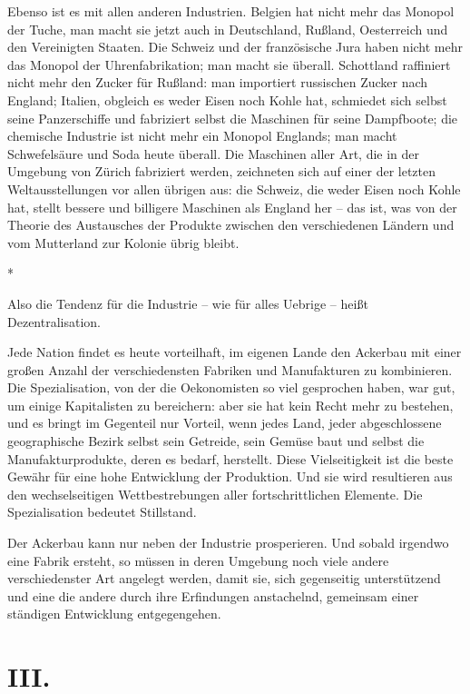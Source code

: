 \documentclass{scrbook}
\begin{document}
Ebenso ist es mit allen anderen Industrien. Belgien hat nicht mehr das Monopol der Tuche, man macht sie jetzt auch in Deutschland, Rußland, Oesterreich und den Vereinigten Staaten. Die Schweiz und der französische Jura haben nicht mehr das Monopol der Uhrenfabrikation; man macht sie überall. Schottland raffiniert nicht mehr den Zucker für Rußland: man importiert russischen Zucker nach England; Italien, obgleich es weder Eisen noch Kohle hat, schmiedet sich selbst seine Panzerschiffe und fabriziert selbst die Maschinen für seine Dampfboote; die chemische Industrie ist nicht mehr ein Monopol Englands; man macht Schwefelsäure und Soda heute überall. Die Maschinen aller Art, die in der Umgebung von Zürich fabriziert werden, zeichneten sich auf einer der letzten Weltausstellungen vor allen übrigen aus: die Schweiz, die weder Eisen noch Kohle hat, stellt bessere und billigere Maschinen als England her – das ist, was von der Theorie des Austausches der Produkte zwischen den verschiedenen Ländern und vom Mutterland zur Kolonie übrig bleibt.

\begin{center}*\end{center}

Also die Tendenz für die Industrie – wie für alles Uebrige – heißt Dezentralisation.

Jede Nation findet es heute vorteilhaft, im eigenen Lande den Ackerbau mit einer großen Anzahl der verschiedensten Fabriken und Manufakturen zu kombinieren. Die Spezialisation, von der die Oekonomisten so viel gesprochen haben, war gut, um einige Kapitalisten zu bereichern: aber sie hat kein Recht mehr zu bestehen, und es bringt im Gegenteil nur Vorteil, wenn jedes Land, jeder abgeschlossene geographische Bezirk selbst sein Getreide, sein Gemüse baut und selbst die Manufakturprodukte, deren es bedarf, herstellt. Diese Vielseitigkeit ist die beste Gewähr für eine hohe Entwicklung der Produktion. Und sie wird resultieren aus den wechselseitigen Wettbestrebungen aller fortschrittlichen Elemente. Die Spezialisation bedeutet Stillstand.

Der Ackerbau kann nur neben der Industrie prosperieren. Und sobald irgendwo eine Fabrik ersteht, so müssen in deren Umgebung noch viele andere verschiedenster Art angelegt werden, damit sie, sich gegenseitig unterstützend und eine die andere durch ihre Erfindungen anstachelnd, gemeinsam einer ständigen Entwicklung entgegengehen.

\section*{III.}
\end{document}
